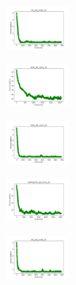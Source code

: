 \vspace*{\fill}
\newpage
\vspace*{\fill}

\begin{figure}[H]
    \centering
    \begin{subfigure}
        \centering
        \includegraphics[width=0.234\textwidth]{img/am01mej/iris_set_const_10_949004259_cost.png}
    \end{subfigure}
    \hfill
    \begin{subfigure}
        \centering
        \includegraphics[width=0.234\textwidth]{img/am01mej/ecoli_set_const_10_949004259_cost.png}
    \end{subfigure}
    \hfill
    \begin{subfigure}
        \centering
        \includegraphics[width=0.234\textwidth]{img/am01mej/rand_set_const_10_949004259_cost.png}
    \end{subfigure}
    \hfill
    \begin{subfigure}
        \centering
        \includegraphics[width=0.234\textwidth]{img/am01mej/newthyroid_set_const_10_949004259_cost.png}
    \end{subfigure}
    \hfill
    \begin{subfigure}
        \centering
        \includegraphics[width=0.234\textwidth]{img/am01mej/iris_set_const_10_589741062_cost.png}

\end{subfigure}
\end{figure}
